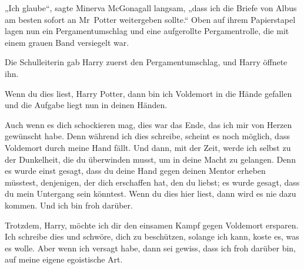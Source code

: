 „Ich glaube“, sagte Minerva McGonagall langsam, „dass ich die Briefe von Albus am besten sofort an Mr~Potter weitergeben sollte.“
Oben auf ihrem Papierstapel lagen nun ein Pergamentumschlag und eine aufgerollte Pergamentrolle, die mit einem grauen Band versiegelt war.

Die Schulleiterin gab Harry zuerst den Pergamentumschlag, und Harry öffnete ihn.

\later

\begin{writtenNote}
Wenn du dies liest, Harry Potter, dann bin ich Voldemort in die Hände gefallen und die Aufgabe liegt nun in deinen Händen.

Auch wenn es dich schockieren mag, dies war das Ende, das ich mir von Herzen gewünscht habe. Denn während ich dies schreibe, scheint es noch möglich, dass Voldemort durch meine Hand fällt. Und dann, mit der Zeit, werde ich selbst zu der Dunkelheit, die du überwinden musst, um in deine Macht zu gelangen. Denn es wurde einst gesagt, dass du deine Hand gegen deinen Mentor erheben müsstest, denjenigen, der dich erschaffen hat, den du liebst; es wurde gesagt, dass du mein Untergang sein könntest. Wenn du dies hier liest, dann wird es nie dazu kommen. Und ich bin froh darüber.

Trotzdem, Harry, möchte ich dir den einsamen Kampf gegen Voldemort ersparen. Ich schreibe dies und schwöre, dich zu beschützen, solange ich kann, koste es, was es wolle. Aber wenn ich versagt habe, dann sei gewiss, dass ich froh darüber bin, auf meine eigene egoistische Art.


\end{writtenNote}
